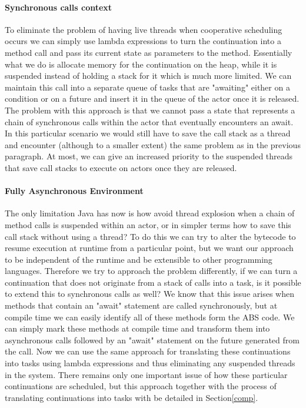 \paragraph{Synchronous calls context}
To eliminate the problem of having live threads when cooperative scheduling occurs we can simply use lambda expressions to turn the continuation into a method call and pass its current state as parameters to the method. Essentially what we do is allocate memory for the continuation on the heap, while it is suspended instead of holding a stack for it which is much more limited.  We can maintain this call into a separate queue of tasks that are "awaiting" either  on a condition or on a future and insert it in the queue of the actor once it is released. The problem with this approach is that we cannot pass a state that represents a chain of synchronous calls within the actor that eventually encounters an await. In this particular scenario we would still have to save the call stack as a thread and encounter (although to a smaller extent) the same problem as in the previous paragraph. At most, we can give an increased priority to the suspended threads that save call stacks to execute on actors once they are released.

\paragraph{Fully Asynchronous Environment}
The only limitation Java has now is how avoid thread explosion when a chain of method calls is suspended within an actor, or in simpler terms how to save this call stack without using a thread? To do this we can try to alter the bytecode to resume execution at runtime from a particular point, but we want our approach to be independent of the runtime and be extensible to other programming languages. Therefore we try to approach the problem differently, if we can turn a continuation that does not originate from a stack of calls into a task, is it possible to extend this to synchronous calls as well? We know that this issue arises when methods that contain an "await" statement are called synchronously, but at compile time we can easily identify all of these methods form the ABS code. We can simply mark these methods at compile time and transform them into asynchronous calls followed by an "await" statement on the future generated from the call. Now we can use the same approach for translating these continuations into tasks using lambda expressions and thus eliminating any suspended threads in the system. There remains only one important issue of how these particular continuations are scheduled, but this approach together with the process of translating continuations into tasks with be detailed in Section\ref{comp}. 



